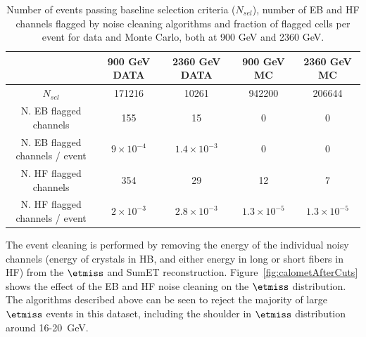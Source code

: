 \begin{table}[!ht]
  \begin{center}
    \begin{tabular}{|c|c|c|c|c|}
      \hline
                                   & 900 GeV DATA  & 2360 GeV DATA & 900 GeV MC & 2360 GeV MC \\
      \hline\hline
      $N_{sel}$                    & 171216           & 10261              & 942200              & 206644                 \\
      \hline\hline
      N. EB flagged channels             & 155              & 15                 & 0                   & 0                      \\
      N. EB flagged channels / event     & $9 \times 10^{-4}$ & $1.4 \times 10^{-3}$ & 0                   & 0                      \\
      \hline\hline
      N. HF flagged channels             & 354              & 29                 & 12                  & 7                      \\
      N. HF flagged channels / event     & $2 \times 10^{-3}$ & $2.8 \times 10^{-3}$ & $1.3 \times 10^{-5}$  & $1.3 \times 10^{-5}$     \\
      \hline\hline
  \end{tabular}
    \caption{Number of events passing baseline selection criteria ($N_{sel}$), number of EB and HF channels flagged by noise cleaning algorithms 
and fraction of flagged cells per event for data and Monte Carlo, both at 900 GeV and 2360 GeV.}
    \label{tab:noiseCleaning}
  \end{center}
\end{table}

The event cleaning is performed by removing the energy of the 
individual noisy channels (energy of crystals in HB, and either energy in 
long or short fibers in HF) from the $\etmiss$ and SumET reconstruction.
Figure~\ref{fig:calometAfterCuts} shows the effect of the EB and HF 
noise cleaning on the $\etmiss$ distribution.
The algorithms described above can be seen to reject the majority of
large $\etmiss$ events in this dataset, 
including the shoulder in $\etmiss$ distribution around 16-20~GeV.




